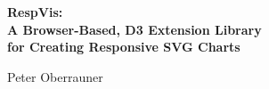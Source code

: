 %
%
% 
% 
% 




\vspace*{2cm}


\begin{center}
    \begin{spacing}{1.1}
        \Huge\sffamily\bfseries
        RespVis:\\
        A Browser-Based, D3 Extension Library\\
        for Creating Responsive SVG Charts
    \end{spacing}

    \vspace{3cm}


    \vspace{3cm}

    {\LARGE\sffamily
        Peter Oberrauner
    }
\end{center}








\cleardoublepage


\vspace*{-3cm}

